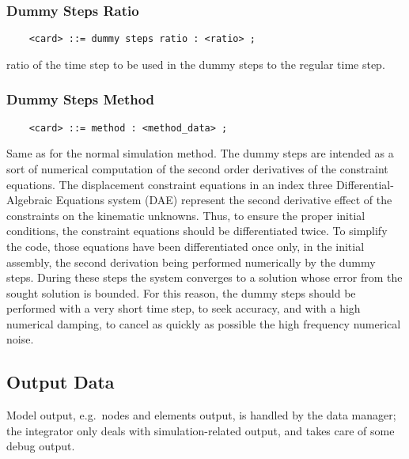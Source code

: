 \subsubsection{Dummy Steps Ratio}
\begin{verbatim}
    <card> ::= dummy steps ratio : <ratio> ;
\end{verbatim}
ratio of the time step to be used in the dummy steps to the regular
time step.

\subsubsection{Dummy Steps Method}
\begin{verbatim}
    <card> ::= method : <method_data> ;
\end{verbatim}
Same as for the normal simulation method. 
The dummy steps are intended as a sort of numerical computation 
of the second order derivatives of the constraint equations. 
The displacement constraint equations in an index three 
Differential-Algebraic Equations system
(DAE) represent the second derivative effect of the constraints on the
kinematic unknowns. Thus, to ensure the proper initial conditions, the
constraint equations should be differentiated twice. To simplify the code,
those equations have been differentiated once only, in the initial assembly,
the second derivation being performed numerically by the dummy steps.
During these steps the system converges to a solution whose error from
the sought solution is bounded. For this reason, the dummy steps
should be performed with a very short time step, to seek accuracy, and
with a high numerical damping, to cancel as quickly as possible the high
frequency numerical noise.

\subsection{Output Data}
Model output, e.g.\ nodes and elements output, is handled
by the data manager; the integrator only deals with
simulation-related output, and takes care of some debug output.

